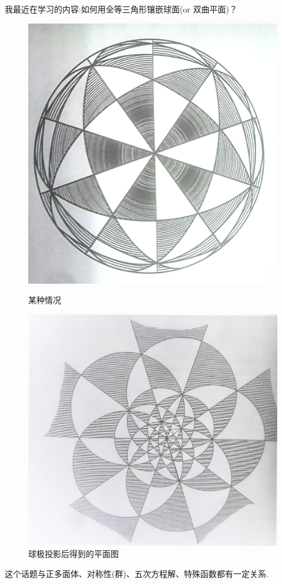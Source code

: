 \documentclass[pdf]{beamer}
\numberwithin{equation}{section}
\theoremstyle{plain}
\theoremstyle{plain}
\theoremstyle{plain}
\theoremstyle{remark}
\begin{document}
\begin{frame}
	\hspace*{20pt}我最近在学习的内容:如何用全等三角形镶嵌球面(or 双曲平面)？
	\begin{figure}[th]
		\begin{minipage}[t]{.45\textwidth}
			\centering
			\includegraphics[width=.75\textwidth]{figures/ball.jpg}
			\caption{某种情况}
			\label{fig1}
		\end{minipage}
		\begin{minipage}[t]{.45\textwidth}
			\centering
			\includegraphics[width=.85\textwidth]{figures/proj.jpg}
			\caption{球极投影后得到的平面图}
			\label{fig2}
		\end{minipage}
	\end{figure}
	\hspace*{20pt}这个话题与正多面体、对称性(群)、五次方程解、特殊函数都有一定关系.
\end{frame}
\end{document}

